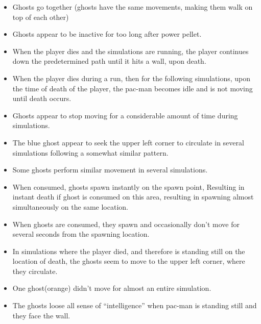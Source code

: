 \begin{itemize}
	\item Ghosts go together (ghosts have the same movements, making them walk on top of each other)
	\item Ghosts appear to be inactive for too long after power pellet.
	\item When the player dies and the simulations are running, the player continues down the predetermined path until it hits a wall, upon death.
	\item When the player dies during a run, then for the following simulations, upon the time of death of the player, the pac-man becomes idle and is not moving until death occurs.
	\item Ghosts appear to stop moving for a considerable amount of time during simulations.
	\item The blue ghost appear to seek the upper left corner to circulate in several simulations following a somewhat similar pattern.
	\item Some ghosts perform similar movement in several simulations.
	\item When consumed, ghosts spawn instantly on the spawn point, Resulting in instant death if ghost is consumed on this area, resulting in spawning almost simultaneously on the same location.
	\item When ghosts are consumed, they spawn and occasionally don’t move for several seconds from the spawning location.
	\item In simulations where the player died, and therefore is standing still on the location of death, the ghosts seem to move to the upper left corner, where they circulate.
	\item One ghost(orange) didn’t move for almost an entire simulation.
	\item The ghosts loose all sense of “intelligence” when pac-man is standing still and they face the wall.
\end{itemize}

